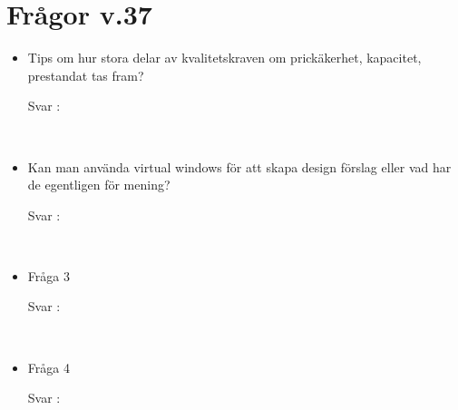 \documentclass{article}
\date {#1}
\title {
    \documentTitle {Helsingborg Event and Convention Bureau}
    
    \documentDate {}
}
\begin{document}
\maketitle
\thispagestyle{empty}

\newpage




\newpage

\section{Frågor v.37}

 
\begin{itemize}
    \item Tips om hur stora delar av kvalitetskraven om prickäkerhet, kapacitet, prestandat tas fram?
        \begin{description}
            \item[Svar :]
        \end{description}
    \\
     \item Kan man använda virtual windows för att skapa design förslag eller vad har de egentligen för mening?
        \begin{description}
            \item[Svar :]
        \end{description}
    \\
    \item Fråga 3
        \begin{description}
            \item[Svar :]
        \end{description}  
    \\
     \item Fråga 4
        \begin{description}
            \item[Svar :]
        \end{description}
    \\
\end{itemize}
\end{document}

